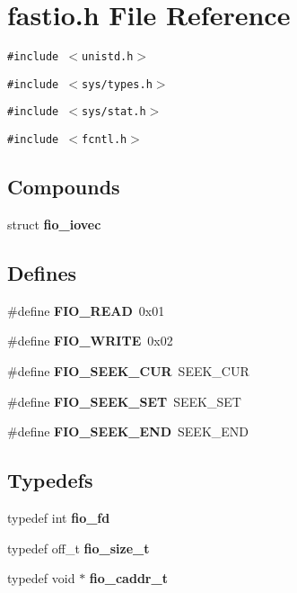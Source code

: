 \section{fastio.h File Reference}
\label{fastio_8h}
{\tt \#include $<$unistd.h$>$}\par
{\tt \#include $<$sys/types.h$>$}\par
{\tt \#include $<$sys/stat.h$>$}\par
{\tt \#include $<$fcntl.h$>$}\par
\subsection*{Compounds}
\begin{CompactItemize}
\item 
struct {\bf fio\_\-iovec}
\end{CompactItemize}
\subsection*{Defines}
\begin{CompactItemize}
\item 
\#define {\bf FIO\_\-READ}\ 0x01
\item 
\#define {\bf FIO\_\-WRITE}\ 0x02
\item 
\#define {\bf FIO\_\-SEEK\_\-CUR}\ SEEK\_\-CUR
\item 
\#define {\bf FIO\_\-SEEK\_\-SET}\ SEEK\_\-SET
\item 
\#define {\bf FIO\_\-SEEK\_\-END}\ SEEK\_\-END
\end{CompactItemize}
\subsection*{Typedefs}
\begin{CompactItemize}
\item 
typedef int {\bf fio\_\-fd}
\item 
typedef off\_\-t {\bf fio\_\-size\_\-t}
\item 
typedef void $\ast$ {\bf fio\_\-caddr\_\-t}
\end{CompactItemize}
